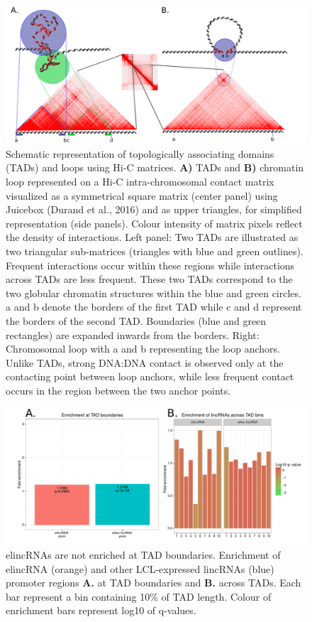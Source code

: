 \documentclass[11pt,a4paper]{report}
\begin{document}
\begin{figure}[ht]
	\includegraphics[width=1\textwidth]{Figures/3_TAD_loop_definition.pdf}
	\caption{Schematic representation of topologically associating domains (TADs) and loops using Hi-C matrices. \textbf{A)} TADs and \textbf{B)} chromatin loop represented on a Hi-C intra-chromosomal contact matrix visualized as a symmetrical square matrix (center panel) using Juicebox (Durand et al., 2016)⁠ and as upper triangles, for simplified representation (side panels). Colour intensity of matrix pixels reflect the density of interactions. Left panel: Two TADs are illustrated as two triangular sub-matrices (triangles with blue and green outlines). Frequent interactions occur within these regions while interactions across TADs are less frequent. These two TADs correspond to the two globular chromatin structures within the blue and green circles. a and b denote the borders of the first TAD while c and d represent the borders of the second TAD. Boundaries (blue and green rectangles) are expanded inwards from the borders. Right: Chromosomal loop with a and b representing the loop anchors. Unlike TADs, strong DNA:DNA contact is observed only at the contacting point between loop anchors, while less frequent contact occurs in the region between the two anchor points. }
	\label{TAD_loop_def}
\end{figure}

\begin{figure}[ht]
	\includegraphics[width=1\textwidth]{Figures/4_enrich_boundaries.pdf}
	\caption{elincRNAs are not enriched at TAD boundaries. Enrichment of elincRNA (orange) and other LCL-expressed lincRNAs (blue) promoter regions \textbf{A.} at TAD boundaries and \textbf{B.} across TADs. Each bar represent a bin containing 10\% of TAD length. Colour of enrichment bars represent log10 of q-values. }
	\label{enrich_boundaries}
\end{figure}
\end{document}
